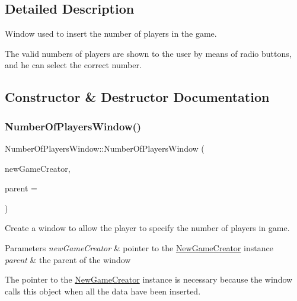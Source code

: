 \subsection{Detailed Description}
Window used to insert the number of players in the game. 

The valid numbers of players are shown to the user by means of radio buttons, and he can select the correct number. 

\subsection{Constructor \& Destructor Documentation}
\mbox{\label{classNumberOfPlayersWindow_a522ce7de553a78ef1514cc988abb8d38}} 
\subsubsection{\texorpdfstring{Number\+Of\+Players\+Window()}{NumberOfPlayersWindow()}}
{\footnotesize\ttfamily Number\+Of\+Players\+Window\+::\+Number\+Of\+Players\+Window (\begin{DoxyParamCaption}\item[{\hyperlink{classNewGameCreator}{New\+Game\+Creator} $\ast$}]{new\+Game\+Creator,  }\item[{Q\+Widget $\ast$}]{parent = {} }\end{DoxyParamCaption})\hspace{0.3cm}{\ttfamily [explicit]}}



Create a window to allow the player to specify the number of players in game. 


\begin{DoxyParams}{Parameters}
{\em new\+Game\+Creator} & pointer to the \hyperlink{classNewGameCreator}{New\+Game\+Creator} instance \\
\hline
{\em parent} & the parent of the window\\
\hline
\end{DoxyParams}
The pointer to the \hyperlink{classNewGameCreator}{New\+Game\+Creator} instance is necessary because the window calls this object when all the data have been inserted. 

